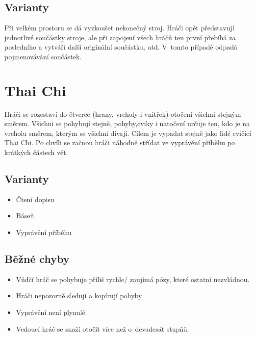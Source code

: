 \subsection{ Varianty } Při velkém prostoru se dá vyzkoušet nekonečný stroj. Hráči opět představují jednotlivé součástky stroje, ale při zapojení všech hráčů ten první přebíhá za posledního a vytváří další originální součástku, atd. V~tomto případě odpadá pojmenovávání součástek. 
 
 
 
 
 
\needspace{5cm} \section{Thai Chi} \label{thai chi} Hráči se rozestaví do čtverce (hrany, vrcholy i vnitřek) otočeni všichni stejným směrem. 
Všichni se pohybují stejně, pohyby,cviky i natočení určuje ten, kdo je na vrcholu směrem, kterým se všichni dívají. 
Cílem je vypadat stejně jako lidé cvičící Thai Chi. 
Po chvíli se začnou hráči náhodně střídat ve vyprávění příběhu po krátkých částech vět. 
\subsection{Varianty} \begin{itemize}
\item Čtení dopisu
\item Báseň
\item Vyprávění příběhu
\end{itemize}
\subsection{Běžné chyby} \begin{itemize}
\item Vůdčí hráč se pohybuje příliš rychle/ zaujímá pózy, které ostatní nezvládnou.
\item Hráči nepozorně sledují a kopírují pohyby
\item Vyprávění není plynulé
\item Vedoucí hráč se snaží otočit více než o~devadesát stupňů.
\end{itemize}
  
